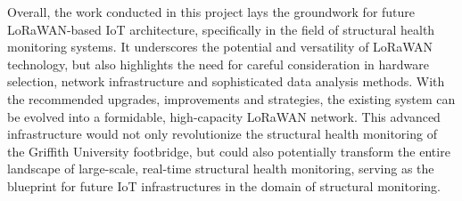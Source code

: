Overall, the work conducted in this project lays the groundwork for future LoRaWAN-based IoT architecture, specifically in the field of structural health monitoring systems. It underscores the potential and versatility of LoRaWAN technology, but also highlights the need for careful consideration in hardware selection, network infrastructure and sophisticated data analysis methods. With the recommended upgrades, improvements and strategies, the existing system can be evolved into a formidable, high-capacity LoRaWAN network. This advanced infrastructure would not only revolutionize the structural health monitoring of the Griffith University footbridge, but could also potentially transform the entire landscape of large-scale, real-time structural health monitoring, serving as the blueprint for future IoT infrastructures in the domain of structural monitoring. 

